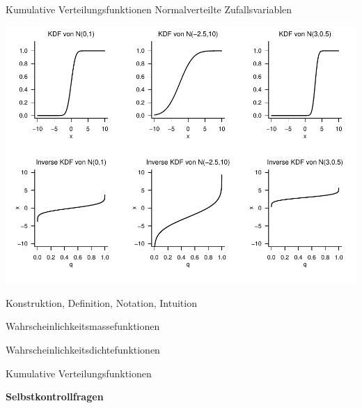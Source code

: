 \documentclass[
  8pt,
  ignorenonframetext,
]{beamer}
\begin{document}
\begin{frame}{Kumulative Verteilungsfunktionen}
\protect\hypertarget{kumulative-verteilungsfunktionen-13}{}
Normalverteilte Zufallsvariablen \vspace{.2cm}

\begin{center}\includegraphics[width=0.8\linewidth]{4_Abbildungen/wtfi_4_normalverteilung_ikvf} \end{center}
\end{frame}

\begin{frame}{}
\protect\hypertarget{section-9}{}
\large
{}
\vfill

Konstruktion, Definition, Notation, Intuition

Wahrscheinlichkeitsmassefunktionen

Wahrscheinlichkeitsdichtefunktionen

Kumulative Verteilungsfunktionen

\textbf{Selbstkontrollfragen}
\end{frame}
\end{document}
